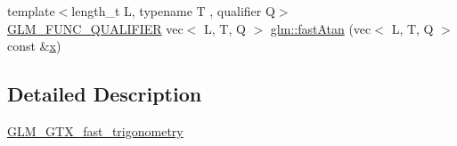 \begin{DoxyCompactItemize}
\item 
{\footnotesize template$<$length\+\_\+t L, typename T , qualifier Q$>$ }\\\hyperlink{setup_8hpp_a33fdea6f91c5f834105f7415e2a64407}{G\+L\+M\+\_\+\+F\+U\+N\+C\+\_\+\+Q\+U\+A\+L\+I\+F\+I\+ER} vec$<$ L, T, Q $>$ \hyperlink{namespaceglm_a3454e48a4d7550d56d91858645bf2928}{glm\+::fast\+Atan} (vec$<$ L, T, Q $>$ const \&\hyperlink{_s_d_l__opengl_8h_ad0e63d0edcdbd3d79554076bf309fd47}{x})
\end{DoxyCompactItemize}


\subsection{Detailed Description}
\hyperlink{group__gtx__fast__trigonometry}{G\+L\+M\+\_\+\+G\+T\+X\+\_\+fast\+\_\+trigonometry} 